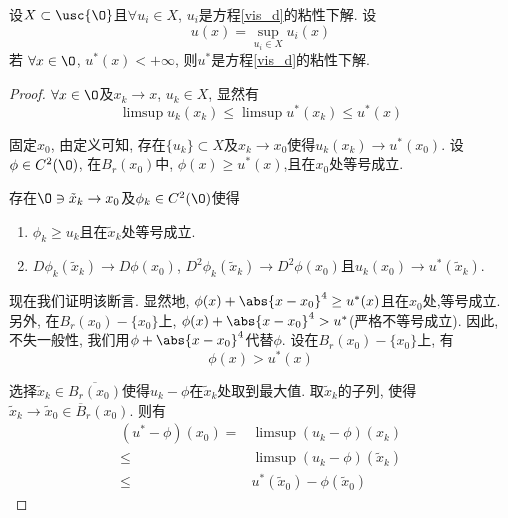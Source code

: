 \begin{lemma} \label{vis_l1}
    设$X \subset \usc{\O}$且$\forall u_i \in X$, $u_i$是方程\eqref{vis_d}的粘性下解. 设
    \begin{equation}
        u(x)=\sup_{u_i\in X}u_i(x)
    \end{equation}
    若 $\forall x \in \O$, $u^*(x) < +\infty$, 则$u^*$是方程\eqref{vis_d}的粘性下解.
\end{lemma}
\begin{proof}
    $\forall x \in \O$及$x_k \to x$, $u_k \in X$, 显然有
    \begin{equation}
        \limsup u_k(x_k) \le \limsup u^*(x_k) \le u^*(x)
    \end{equation}
    \par 固定$x_0$, 由定义可知, 存在$\{u_k\} \subset X$及$x_k \to x_0$使得$u_k(x_k) \to u^*(x_0)$.  设$\phi \in C^2(\O)$, 在$B_r(x_0)$中, $\phi(x) \ge u^*(x)$,且在$x_0$处等号成立.  
    \begin{claim}
        存在$\O \ni \tilde{x}_k \to x_0$及$\phi_k \in C^2(\O)$使得
        \begin{enumerate}
            \item $\phi_k \ge u_k$且在$\tilde{x}_k$处等号成立.
            \item $D\phi_k(\tilde{x}_k) \to D\phi(x_0)$, $D^2\phi_k(\tilde{x}_k) \to D^2\phi(x_0)$且$u_k(x_0) \to u^*(\tilde{x}_k)$.
        \end{enumerate}
    \end{claim}
    现在我们证明该断言. 显然地, $\phi(x)+\abs{x-x_0}^4 \ge u^*(x)$且在$x_0$处,等号成立. 另外, 在$B_r(x_0)-\{x_0\}$上, $\phi(x)+\abs{x-x_0}^4 >u^*$(严格不等号成立).   因此, 不失一般性, 我们用$\phi+\abs{x-x_0}^4$代替$\phi$. 设在$B_r(x_0)-\{x_0\}$上, 有
    \begin{equation} \label{strict_in}
        \phi(x) > u^*(x)
    \end{equation}
    \par 选择$\tilde{x}_k \in \overline{B_r(x_0)}$使得$u_k -\phi$在$\tilde{x}_k$处取到最大值. 取$\tilde{x}_k$的子列, 使得$\tilde{x}_k \to \tilde{x}_0 \in \overline{B}_r(x_0)$. 则有
    \begin{equation}
        \begin{split}
            (u^*-\phi)(x_0)=&\limsup (u_k-\phi)(x_k) \\
            \le & \limsup(u_k-\phi)(\tilde{x}_k) \\
            \le & u^*(\tilde{x}_0)-\phi(\tilde{x}_0)
        \end{split}

\end{equation}
\end{proof}
